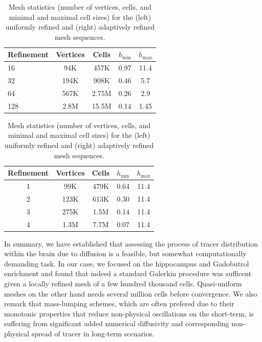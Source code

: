\begin{table}%
  \label{chp6:meshstat}
  \centering
  \begin{minipage}{.45\textwidth}%
    \begin{tabular}{l|cccc}
      Refinement & Vertices & Cells  & $h_{\min}$ & $h_{\max}$ \\ \hline
      16 & 94K & 457K & 0.97 & 11.4 \\  
      32 & 194K & 908K &  0.46 & 5.7 \\  
      64 & 567K &  2.75M & 0.26 & 2.9 \\
      128 &  2.8M & 15.5M &  0.14 & 1.45
    \end{tabular}
    \label{tab:uniref}
  \end{minipage}%
  \hspace{2em}
  \begin{minipage}{.45\textwidth}%
    \begin{tabular}{c|cccc}
	    Refinement & Vertices & Cells & $h_{\min}$ & $h_{\max}$ \\ \hline
	     1 & 99K &  479K &  0.64 &  11.4 \\
	     2 & 123K& 613K & 0.30 &  11.4 \\
	     3 & 275K &  1.5M  &  0.14 & 11.4 \\
	     4 & 1.3M &  7.7M  & 0.07 &  11.4 \\
    \end{tabular}
    \label{tab:localref}
  \end{minipage}%
  \caption{Mesh statistics (number of vertices, cells, and minimal and
    maximal cell sizes) for the (left) uniformly refined and
    (right) adaptively refined mesh sequences.}
\end{table}


In summary, we have established that assessing the process of  tracer distribution within the brain due to diffusion is a feasible, but somewhat
computationally demanding task. In our case, we focused on the hippocampus and Gadobutrol enrichment and found that indeed 
a standard Galerkin procedure was sufficent given a locally refined mesh of a few hundred thousand cells. Quasi-uniform meshes on the
other hand needs several million cells before convergence. We also remark that mass-lumping schemes, which are often prefered due
to their monotonic properties that reduce non-physical oscillations on the short-term, is suffering from significant added numerical diffusivity
and corresponding non-physical spread of tracer in long-term scenarios.     
